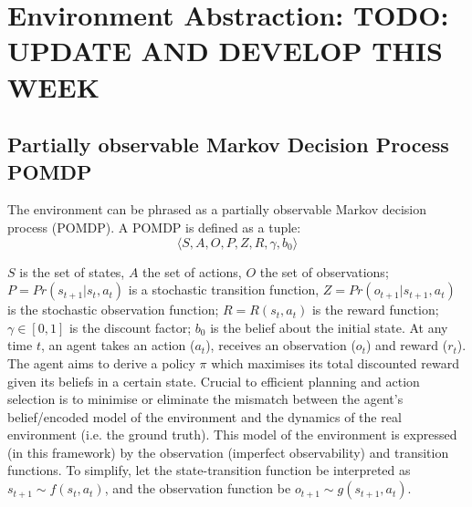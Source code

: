 \section{Environment Abstraction: TODO: UPDATE AND DEVELOP THIS WEEK} \label{MDP/POMDP}
\subsection{Partially observable Markov Decision Process POMDP}
The environment can be phrased as a partially observable Markov decision process (POMDP). 
A POMDP is defined as a tuple: 
\begin{equation}
    \langle S, A, O, P, Z, R, \gamma, b_0 \rangle
\end{equation}

\noindent$S$ is the set of states, $A$ the set of actions, $O$ the set of observations; 
\newline \newline  
$P = Pr(s_{t+1}|s_t, a_t)$ is a stochastic transition function, \newline \newline 
 $Z = Pr(o_{t+1}|s_{t+1},a_{t})$ is the stochastic observation function; 
 \newline \newline
 $R = R(s_t, a_t)$ is the reward function;
 \newline \newline
 $\gamma \in [0,1]$ is the discount factor;
 \newline \newline 
 $b_0$ is the belief about the initial state.
\newline \newline 
At any time $t$, an agent takes an action ($a_t$), receives an observation ($o_t$) and reward ($r_t$). The agent aims to derive a policy $\pi$ which maximises its total discounted reward given its beliefs in a certain state. 
\newline \newline
Crucial to efficient planning and action selection is to minimise or eliminate the mismatch between the agent's belief/encoded model of the environment and the dynamics of the real environment (i.e. the ground truth). This model of the environment is expressed (in this framework) by the observation (imperfect observability) and transition functions. 
\newline \newline
To simplify, let the state-transition function be interpreted as $s_{t+1} \sim f(s_t,a_t)$, and the observation function be $o_{t+1} \sim g(s_{t+1}, a_t)$. 
